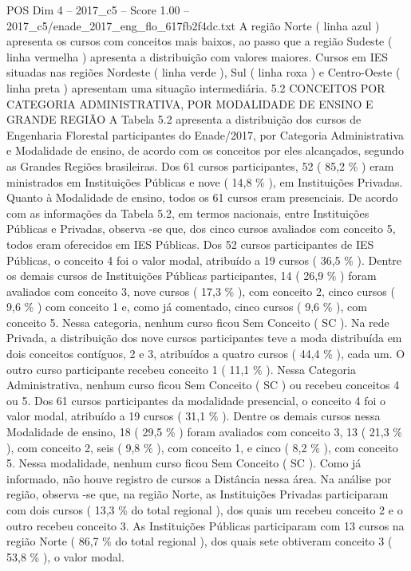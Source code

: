 \begin{textsample}{POS Dim 4 – 2017\_c5 – Score 1.00 – 2017\_c5/enade\_2017\_eng\_flo\_617fb2f4dc.txt}
A região Norte ( linha azul ) apresenta os cursos com conceitos mais baixos, ao passo que a região Sudeste ( linha vermelha ) apresenta a distribuição com valores maiores.
Cursos em IES situadas nas regiões Nordeste ( linha verde ), Sul ( linha roxa ) e Centro-Oeste ( linha preta ) apresentam uma situação intermediária. 5.2 CONCEITOS POR CATEGORIA ADMINISTRATIVA, POR MODALIDADE DE ENSINO E GRANDE REGIÃO A Tabela 5.2 apresenta a distribuição dos cursos de Engenharia Florestal participantes do Enade/2017, por Categoria Administrativa e Modalidade de ensino, de acordo com os conceitos por eles alcançados, segundo as Grandes Regiões brasileiras.
Dos 61 cursos participantes, 52 ( 85,2 \% ) eram ministrados em Instituições Públicas e nove ( 14,8 \% ), em Instituições Privadas.
Quanto à Modalidade de ensino, todos os 61 cursos eram presenciais.
De acordo com as informações da Tabela 5.2, em termos nacionais, entre Instituições Públicas e Privadas, observa -se que, dos cinco cursos avaliados com conceito 5, todos eram oferecidos em IES Públicas.
Dos 52 cursos participantes de IES Públicas, o conceito 4 foi o valor modal, atribuído a 19 cursos ( 36,5 \% ).
Dentre os demais cursos de Instituições Públicas participantes, 14 ( 26,9 \% ) foram avaliados com conceito 3, nove cursos ( 17,3 \% ), com conceito 2, cinco cursos ( 9,6 \% ) com conceito 1 e, como já comentado, cinco cursos ( 9,6 \% ), com conceito 5.
Nessa categoria, nenhum curso ficou Sem Conceito ( SC ).
Na rede Privada, a distribuição dos nove cursos participantes teve a moda distribuída em dois conceitos contíguos, 2 e 3, atribuídos a quatro cursos ( 44,4 \% ), cada um.
O outro curso participante recebeu conceito 1 ( 11,1 \% ).
Nessa Categoria Administrativa, nenhum curso ficou Sem Conceito ( SC ) ou recebeu conceitos 4 ou 5.
Dos 61 cursos participantes da modalidade presencial, o conceito 4 foi o valor modal, atribuído a 19 cursos ( 31,1 \% ).
Dentre os demais cursos nessa Modalidade de ensino, 18 ( 29,5 \% ) foram avaliados com conceito 3, 13 ( 21,3 \% ), com conceito 2, seis ( 9,8 \% ), com conceito 1, e cinco ( 8,2 \% ), com conceito 5.
Nessa modalidade, nenhum curso ficou Sem Conceito ( SC ).
Como já informado, não houve registro de cursos a Distância nessa área.
Na análise por região, observa -se que, na região Norte, as Instituições Privadas participaram com dois cursos ( 13,3 \% do total regional ), dos quais um recebeu conceito 2 e o outro recebeu conceito 3.
As Instituições Públicas participaram com 13 cursos na região Norte ( 86,7 \% do total regional ), dos quais sete obtiveram conceito 3 ( 53,8 \% ), o valor modal.

\end{textsample}
